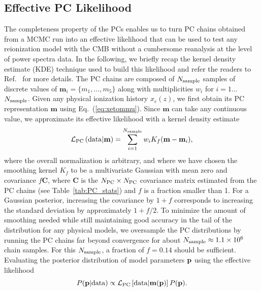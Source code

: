 \documentclass[prd,twocolumn,amsmath,amssymb,floatfix,superscriptaddress,nofootinbib]{revtex4-1}
\newcommand{\sample}{{\rm sample}}
\newcommand{\beq}{\begin{equation}}
\newcommand{\eeq}{\end{equation}}
\begin{document}
%
%
%
%

\subsection{Effective PC Likelihood}
\label{sec:KDE}
The completeness property of the PCs enables us to turn PC chains obtained from a MCMC run into an effective likelihood that can be used to test any reionization model with the CMB without a cumbersome reanalysis at the level of power spectra data. In the following, we briefly recap the kernel density estimate (KDE) technique used to build this likelihood and refer the readers to Ref.~\cite{Heinrich:2016ojb} for more details.
The PC chains are composed of $N_{\rm sample}$ samples of discrete values of $\mathbf{m}_i = \{m_1, \ldots, m_5\}$ along with multiplicities $w_i$ for $i = 1$...$N_{\rm sample}$. Given any physical ionization history $x_e(z)$, we first obtain its PC representation $\mathbf{m}$ using Eq.~(\ref{eq:xetommu}). Since $\mathbf{m}$ can take any continuous value, we approximate its effective likelihood with a kernel density estimate
\beq
{\cal L}_{\rm PC}\left({\rm data}|\mathbf{m} \right)  = \sum_{i = 1}^{N_{\rm sample}} w_i K_f(\mathbf{m}-\mathbf{m}_i),
\eeq
where the overall normalization is arbitrary, and where we have chosen the smoothing kernel $K_f$ to be a  multivariate Gaussian with mean zero and covariance $f\mathbf{C}$, where $\mathbf{C}$ is the $N_{\rm PC} \times N_{\rm PC}$ covariance matrix estimated from the PC chains (see Table~\ref{tab:PC_stats}) and $f$ is a fraction smaller than 1.
For a Gaussian posterior, increasing the covariance by $1+f$ corresponds to increasing the standard deviation by approximately $1+f/2$. To minimize the amount of smoothing needed while still maintaining good accuracy in the tail of the distribution for any physical models, we oversample the PC distributions by running the PC chains far beyond convergence for about $N_{\sample} \approx 1.1 \times 10^{6}$ chain samples. 
For this $N_{\sample}$, a fraction of $f = 0.14$ should be sufficient.
Evaluating the posterior distribution of model parameters $\bf p$ using the effective likelihood
\begin{equation}
P({\bf p}| {\rm data}) \propto {\cal L}_{\rm PC}\left[ {\rm data}|\mathbf{m}(\bf p) \right] P(\bf p).
\end{equation}
\end{document}
